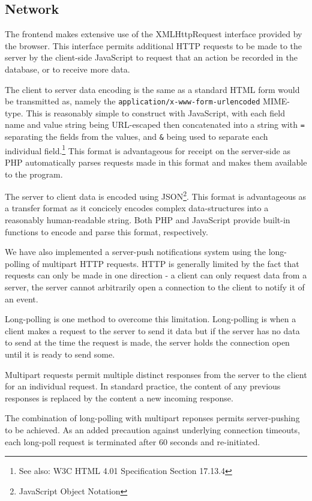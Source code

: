 \documentclass[12pt]{amsart}
\begin{document}
  \subsection{Network}
    \begin{flushleft}
      The frontend makes extensive use of the XMLHttpRequest interface provided 
      by the browser. This interface permits additional HTTP requests to be made 
      to the server by the client-side JavaScript to request that an action be 
      recorded in the database, or to receive more data.

      The client to server data encoding is the same as a standard HTML form 
      would be transmitted as, namely the 
      \verb|application/x-www-form-urlencoded| MIME-type. This is reasonably 
      simple to construct with JavaScript, with each field name and value
      string being URL-escaped then concatenated into a string with \verb|=| 
      separating the fields from the values, and \verb|&| being used to separate 
      each individual field.\footnote{See also: W3C HTML 4.01 Specification Section 
      17.13.4} This format is advantageous for receipt on the server-side as PHP 
      automatically parses requests made in this format and makes them available
      to the program.

      The server to client data is encoded using JSON\footnote{JavaScript Object 
      Notation}. This format is advantageous as a transfer format as it 
      concicely encodes complex data-structures into a reasonably human-readable 
      string. Both PHP and JavaScript provide built-in functions to encode and 
      parse this format, respectively.

      We have also implemented a server-push notifications system using the 
      long-polling of multipart HTTP requests. HTTP is generally limited by the 
      fact that requests can only be made in one direction - a client can only 
      request data from a server, the server cannot arbitrarily open a 
      connection to the client to notify it of an event.
      
      Long-polling is one 
      method to overcome this limitation. Long-polling is when a client makes a 
      request to the server to send it data but if the server has no data to 
      send at the time the request is made, the server holds the connection open 
      until it is ready to send some.
      
      Multipart requests permit multiple distinct responses from the server to 
      the client for an individual request. In standard practice, the content of 
      any previous responses is replaced by the content a new incoming response.

      The combination of long-polling with multipart reponses permits 
      server-pushing to be achieved. As an added precaution against underlying 
      connection timeouts, each long-poll request is terminated after 60 seconds 
      and re-initiated.
    \end{flushleft}
\end{document}
